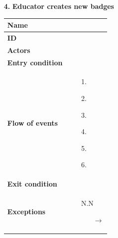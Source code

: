 \documentclass{article}
\begin{document}
{\begin{enumerate}
                    \item[\textbf{4.}] \textbf{Educator creates new badges}
                    \begin{xltabular}{\textwidth}
                        {| >{\raggedright\arraybackslash}g | >{\raggedright\arraybackslash}X |}      
                        \hline
                        \endfirsthead
                        \hline
                        \endhead
                        \endfoot
                        \hline
                        \endlastfoot
                        

                        
                        
                        \textbf{Name} & \\
                        \hline
                        \textbf{ID} & \\
                        \hline
                        \textbf{Actors} & \\
                        \hline
                        \textbf{Entry condition} & \\
                        \hline
                        \textbf{Flow of events} &    \begin{enumerate}
                                                        \item[1.] 
                                                        \item[2.] 
                                                        \item[3.] 
                                                        \item[4.] 
                                                        \item[5.] 
                                                        \item[6.] 
                                                    \end{enumerate} \\
                        \hline
                        \textbf{Exit condition} &  \\
                        \hline
                        \textbf{Exceptions} &    \begin{itemize}
                                                    \item[N.N] 
                                                    \begin{itemize}
                                                        \item[$\rightarrow$] 
                                                    \end{itemize} 
                                                \end{itemize}
                    \end{xltabular}
                    

\end{enumerate}}
\end{document}
